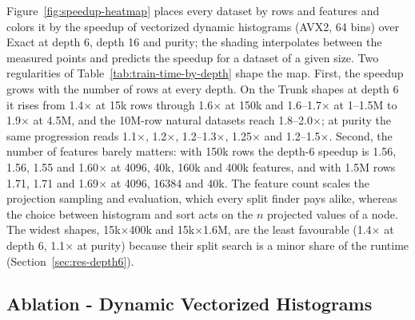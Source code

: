 \documentclass[sigconf]{acmart}%
\begin{document}
Figure~\ref{fig:speedup-heatmap} places every dataset by rows and features and colors it by the speedup of vectorized dynamic histograms (AVX2, 64 bins) over Exact at depth 6, depth 16 and purity; the shading interpolates between the measured points and predicts the speedup for a dataset of a given size. Two regularities of Table~\ref{tab:train-time-by-depth} shape the map. First, the speedup grows with the number of rows at every depth. On the Trunk shapes at depth 6 it rises from 1.4$\times$ at 15k rows through 1.6$\times$ at 150k and 1.6--1.7$\times$ at 1--1.5M to 1.9$\times$ at 4.5M, and the 10M-row natural datasets reach 1.8--2.0$\times$; at purity the same progression reads 1.1$\times$, 1.2$\times$, 1.2--1.3$\times$, 1.25$\times$ and 1.2--1.5$\times$. Second, the number of features barely matters: with 150k rows the depth-6 speedup is 1.56, 1.56, 1.55 and 1.60$\times$ at 4096, 40k, 160k and 400k features, and with 1.5M rows 1.71, 1.71 and 1.69$\times$ at 4096, 16384 and 40k. The feature count scales the projection sampling and evaluation, which every split finder pays alike, whereas the choice between histogram and sort acts on the $n$ projected values of a node. The widest shapes, 15k$\times$400k and 15k$\times$1.6M, are the least favourable (1.4$\times$ at depth 6, 1.1$\times$ at purity) because their split search is a minor share of the runtime (Section~\ref{sec:res-depth6}).





\subsection{Ablation - Dynamic Vectorized Histograms}
\label{sec:dyn}
\end{document}
